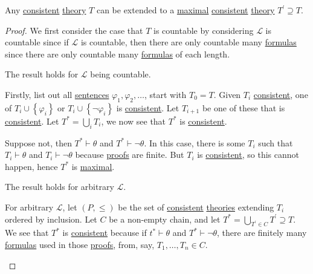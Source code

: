 \begin{theorem}
	Any \hyperref[def:consistent]{consistent} \hyperref[def:theory]{theory} \(T\) can be extended to a \hyperref[def:maximal]{maximal} \hyperref[def:consistent]{consistent} \hyperref[def:theory]{theory} \(T^\prime \supseteq T\).
\end{theorem}
\begin{proof}
	We first consider the case that \(T\) is countable by considering \(\mathcal{L} \) is countable since if \(\mathcal{L} \) is countable, then there are only countable many \hyperref[def:formula]{formulas} since there are only countable many \hyperref[def:formula]{formulas} of each length.

	\begin{claim}
		The result holds for \(\mathcal{L} \) being countable.
	\end{claim}
	\begin{explanation}
		Firstly, list out all \hyperref[def:sentence]{sentences} \(\varphi _1, \varphi _2, \ldots \), start with \(T_0 = T\). Given \(T_i\) \hyperref[def:consistent]{consistent}, one of \(T_i \cup \left\{ \varphi _i \right\} \) or \(T_i \cup \left\{ \lnot \varphi _i \right\} \) is \hyperref[def:consistent]{consistent}. Let \(T_{i+1} \) be one of these that is \hyperref[def:consistent]{consistent}. Let \(T^{\ast} = \bigcup_{i} T_i \), we now see that  \(T^{\ast} \) is \hyperref[def:consistent]{consistent}.

		Suppose not, then \(T^{\ast} \vdash \theta \) and \(T^{\ast} \vdash \lnot \theta \). In this case, there is some \(T_i\) such that \(T_i \vdash \theta \) and \(T_i \vdash \lnot \theta \) because \hyperref[def:proof]{proofs} are finite. But \(T_i\) is \hyperref[def:consistent]{consistent}, so this cannot happen, hence \(T^{\ast} \) is \hyperref[def:maximal]{maximal}.
	\end{explanation}

	\begin{claim}
		The result holds for arbitrary \(\mathcal{L} \).
	\end{claim}
	\begin{explanation}
		For arbitrary \(\mathcal{L} \), let \((P, \leq )\) be the set of \hyperref[def:consistent]{consistent} \hyperref[def:theory]{theories} extending \(T_i\) ordered by inclusion. Let \(C\) be a non-empty chain, and let \(T^{\ast} = \bigcup_{T^\prime \in C} T^\prime \supseteq T \). We see that \(T^{\ast} \) is \hyperref[def:consistent]{consistent} because if \(t^{\ast} \vdash \theta \) and \(T^{\ast} \vdash \lnot \theta \), there are finitely many \hyperref[def:formula]{formulas} used in those \hyperref[def:proof]{proofs}, from, say, \(T_1, \ldots , T_n \in C\).


\end{explanation}
\end{proof}
